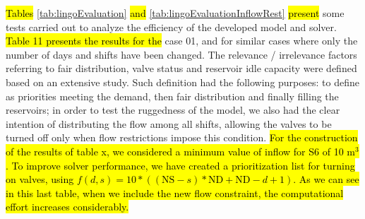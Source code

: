 \documentclass{singlecol}
\theoremstyle{TH}{
\newtheorem{lemma}{Lemma}
\newtheorem{theorem}[lemma]{Theorem}
\newtheorem{corrolary}[lemma]{Corrolary}
\newtheorem{conjecture}[lemma]{Conjecture}
\newtheorem{proposition}[lemma]{Proposition}
\newtheorem{claim}[lemma]{Claim}
\newtheorem{stheorem}[lemma]{Wrong Theorem}
\newtheorem{algorithm}{Algorithm}
}
\theoremstyle{THrm}{
\newtheorem{definition}{Definition}[section]
\newtheorem{question}{Question}[section]
\newtheorem{remark}{Remark}
\newtheorem{scheme}{Scheme}
}
\theoremstyle{THhit}{
\newtheorem{case}{Case}[section]
}
\begin{document}
\hl{Tables} \ref{tab:lingoEvaluation} \hl{and} \ref{tab:lingoEvaluationInflowRest} \hl{present} some tests carried out to analyze the efficiency of the developed model and solver. \hl{Table 11 presents the results for the} case 01, and for similar cases where only the number of days and shifts have been changed. The relevance / irrelevance factors referring to fair distribution, valve status and reservoir idle capacity were defined based on an extensive study. Such definition had the following purposes: to define as priorities meeting the demand, then fair distribution and finally filling the reservoirs; in order to test the ruggedness of the model, we also had the clear intention of distributing the flow among all shifts, allowing the valves to be turned off only when flow restrictions impose this condition. \hl{For the construction of the results of table x, we considered a minimum value of inflow for S6 of 10 $\mathrm{m^3}$. To improve solver performance, we have created a prioritization list for turning on valves, using $f(d,s) = 10*((\mathrm{NS}-s)*\mathrm{ND} + \mathrm{ND} - d + 1)$. As we can see in this last table, when we include the new flow constraint, the computational effort increases considerably.} 
\end{document}
